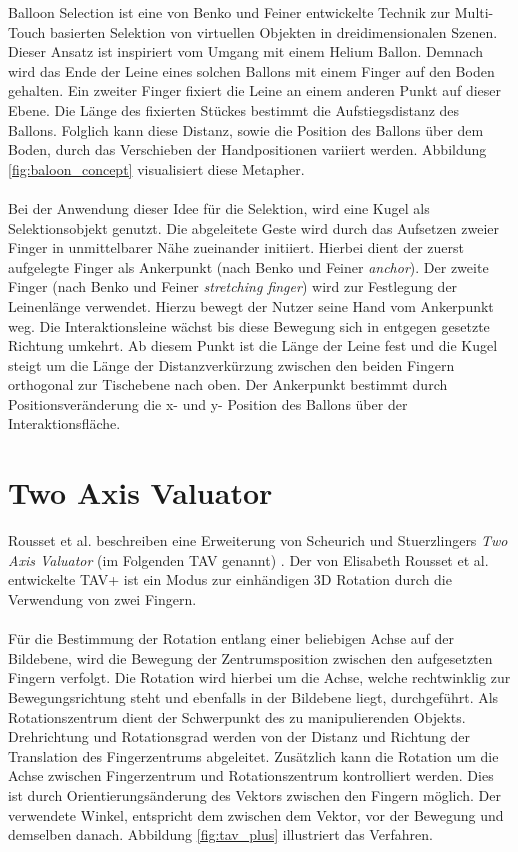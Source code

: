 Balloon Selection ist eine von Benko und Feiner \cite{benko:2007} entwickelte Technik zur Multi-Touch basierten Selektion von virtuellen Objekten in dreidimensionalen Szenen. Dieser Ansatz ist inspiriert vom Umgang mit einem Helium Ballon. Demnach wird das Ende der Leine eines solchen Ballons mit einem Finger auf den Boden gehalten. Ein zweiter Finger fixiert die Leine an einem anderen Punkt auf dieser Ebene. Die Länge des fixierten Stückes bestimmt die Aufstiegsdistanz des Ballons. Folglich kann diese Distanz, sowie die Position des Ballons über dem Boden, durch das Verschieben der Handpositionen variiert werden. Abbildung \ref{fig:baloon_concept} visualisiert diese Metapher.
\\\\
Bei der Anwendung dieser Idee für die Selektion, wird eine Kugel als Selektionsobjekt genutzt. Die abgeleitete Geste wird durch das Aufsetzen zweier Finger in unmittelbarer Nähe zueinander initiiert. Hierbei dient der zuerst aufgelegte Finger als Ankerpunkt (nach Benko und Feiner \emph{anchor}). Der zweite Finger (nach Benko und Feiner \emph{stretching finger}) wird zur Festlegung der Leinenlänge verwendet. Hierzu bewegt der Nutzer seine Hand vom Ankerpunkt weg. Die Interaktionsleine wächst bis diese Bewegung sich in entgegen gesetzte Richtung umkehrt. Ab diesem Punkt ist die Länge der Leine fest und die Kugel steigt um die Länge der Distanzverkürzung zwischen den beiden Fingern orthogonal zur Tischebene nach oben. Der Ankerpunkt bestimmt durch Positionsveränderung die x- und y- Position des Ballons über der Interaktionsfläche.


\section{Two Axis Valuator}
\label{sec:related_two_axis_valuator}

Rousset et al. beschreiben eine Erweiterung von Scheurich und Stuerzlingers \emph{Two Axis Valuator} (im Folgenden TAV genannt) \cite{scheurich:2013,rousset:2014}. Der von Elisabeth Rousset et al. entwickelte TAV+ ist ein Modus zur einhändigen 3D Rotation durch die Verwendung von zwei Fingern. 
\\\\
Für die Bestimmung der Rotation entlang einer beliebigen Achse auf der Bildebene, wird die Bewegung der Zentrumsposition zwischen den aufgesetzten Fingern verfolgt. Die Rotation wird hierbei um die Achse, welche rechtwinklig zur Bewegungsrichtung steht und ebenfalls in der Bildebene liegt, durchgeführt. Als Rotationszentrum dient der Schwerpunkt des zu manipulierenden Objekts. Drehrichtung und Rotationsgrad werden von der Distanz und Richtung der Translation des Fingerzentrums abgeleitet. Zusätzlich kann die Rotation um die Achse zwischen Fingerzentrum und Rotationszentrum kontrolliert werden. Dies ist durch Orientierungsänderung des Vektors zwischen den Fingern möglich. Der verwendete Winkel, entspricht dem zwischen dem Vektor, vor der Bewegung und demselben danach. Abbildung \ref{fig:tav_plus} illustriert das Verfahren.

